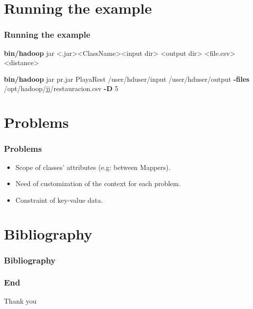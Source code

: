 \documentclass{beamer}
\begin{document}
\section{Running the example}
\begin{frame}
  \frametitle{Running the example}  
  
  {\bfseries bin/hadoop} jar \textless .jar\textgreater \enspace \textless ClassName\textgreater \enspace \textless input dir\textgreater 
  \enspace \textless output dir\textgreater {} \textless file.csv\textgreater {} \textless distance\textgreater 
  \newline
  
  {\bfseries bin/hadoop} jar pr.jar PlayaRest /user/hduser/input /user/hduser/output {\bfseries -files} /opt/hadoop/jj/restauracion.csv {\bfseries -D} 5
  
\end{frame}

\section{Problems}
\begin{frame}
  \frametitle{Problems}
  \begin{itemize}
    \item Scope of classes' attributes (e.g: between Mappers).
    \item Need of customization of the context for each problem.
    \item Constraint of key-value data.
  \end{itemize}
\end{frame}

\section{Bibliography}
\begin{frame}
  \frametitle{Bibliography}
  
  
  \nocite{*}
\end{frame}

\begin{frame}
  \frametitle{End}
  \begin{center}
    \Huge{Thank you}
  \end{center}
\end{frame}
\end{document}
